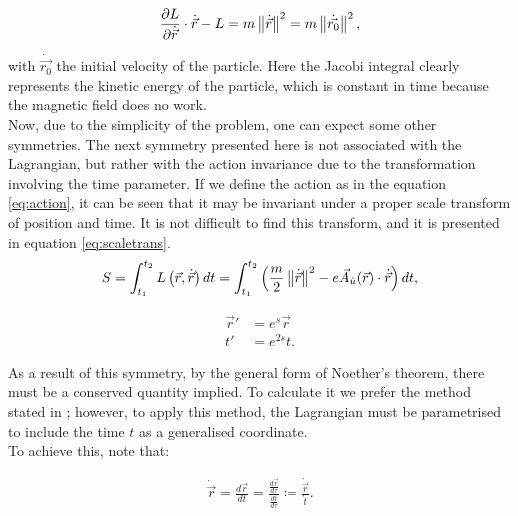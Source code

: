 \begin{equation*}
 \frac{\partial L}{\partial\dot{\vec{r}}}\cdot\dot{\vec{r}} - L = m\left\lVert \dot{\vec{r}} \right\rVert^2                    =m\left\lVert \dot{\vec{r_0}} \right\rVert^2 ,
\end{equation*}

with $\dot{\vec{r_0}}$ the initial velocity of the particle. Here the Jacobi integral clearly represents the kinetic energy of the particle, which is constant in time because the magnetic field does no work.\\

Now, due to the simplicity of the problem, one can expect some other symmetries. The next symmetry presented here is not associated with the Lagrangian, but rather with the action invariance due to the transformation involving the time parameter. If we define the action as in the equation \eqref{eq:action}, it can be seen that it may be invariant under a proper scale transform of position and time. It is not difficult to find this transform, and it is presented in equation \eqref{eq:scaletrans}.\\

\begin{equation}
S = \int_{t_1}^{t_2}L\left( \vec{r},\dot{\vec{r}} \right)dt = \int_{t_1}^{t_2}\left( \frac{m}{2}\left\lVert \dot{\vec{r}} \right\rVert^2 - e\vec{A}_{\hat{u}}(\vec{r})\cdot\dot{\vec{r}} \right)dt,
\label{eq:action}
\end{equation}

\begin{equation}
\begin{aligned}
\vec{r}' &= e^{s}\vec{r}\\
t'&= e^{2s}t.
\end{aligned}
\label{eq:scaletrans}
\end{equation}

As a result of this symmetry, by the general form of Noether's theorem, there must be a conserved quantity implied. To calculate it we prefer the method stated in \cite[2.19 Noether's Thm]{scheck}; however, to apply this method, the Lagrangian must be parametrised to include the time $t$ as a generalised coordinate.\\

To achieve this, note that:

\begin{align*}
\dot{\vec{r}} = \frac{d\vec{r}}{dt} = \frac{\frac{d\vec{r}}{d\tau}}{\frac{dt}{d\tau}} \coloneqq \frac{\mathring{\vec{r}}}{\mathring{t}}.
\end{align*}

